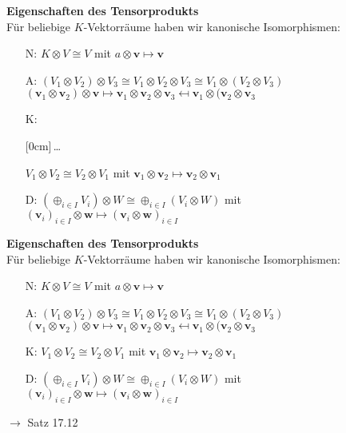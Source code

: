 \documentclass[11pt]{article}
\renewcommand{\cite}[1]{\par\bigskip\hfill{\color{gray}\tiny\(\to\) #1}}
\renewcommand{\vec}[1]{\mathbf{#1}}
\newcommand{\hide}[1]{\parbox{0cm}{\raisebox{-7pt}[0cm]{\dots}}\color{white}#1\color{black}}
\let\olddots\dots
\renewcommand{\dots}{\,\olddots\,}
\newenvironment{field}{}{\newpage}
\newif\ifnote
\newenvironment{note}{\notetrue}{\notefalse}
\begin{document}
\begin{note}
    \begin{field}
        \textbf{Eigenschaften des Tensorprodukts}\\
        Für beliebige $K$-Vektorräume haben wir kanonische Isomorphismen:
        \begin{itemize}
            \item[N:] $K\otimes V \cong V$ mit $a\otimes \vec{v} \mapsto \vec{v}$
            \item[A:] $(V_1\otimes V_2)\otimes V_3 \cong V_1\otimes V_2 \otimes V_3 \cong V_1\otimes (V_2\otimes V_3)$\\
            $(\vec{v}_1\otimes\vec{v}_2)\otimes\vec{v} \mapsto \vec{v}_1\otimes\vec{v}_2\otimes\vec{v}_3 \mapsfrom \vec{v}_1\otimes(\vec{v}_2\otimes\vec{v}_3$
            \item[K:] \hide{$V_1\otimes V_2 \cong V_2\otimes V_1$ mit
            $\vec{v}_1\otimes\vec{v}_2 \mapsto \vec{v}_2\otimes\vec{v}_1$}
            \item[D:] $(\oplus_{i\in I} V_i)\otimes W \cong \oplus_{i\in I}(V_i\otimes W)$ mit \\
            $(\vec{v}_i)_{i\in I}\otimes \vec{w} \mapsto (\vec{v}_i\otimes \vec{w})_{i\in I}$
        \end{itemize}
    \end{field}
    \begin{field}
        \textbf{Eigenschaften des Tensorprodukts}\\
        Für beliebige $K$-Vektorräume haben wir kanonische Isomorphismen:
        \begin{itemize}
            \item[N:] $K\otimes V \cong V$ mit $a\otimes \vec{v} \mapsto \vec{v}$
            \item[A:] $(V_1\otimes V_2)\otimes V_3 \cong V_1\otimes V_2 \otimes V_3 \cong V_1\otimes (V_2\otimes V_3)$\\
            $(\vec{v}_1\otimes\vec{v}_2)\otimes\vec{v} \mapsto \vec{v}_1\otimes\vec{v}_2\otimes\vec{v}_3 \mapsfrom \vec{v}_1\otimes(\vec{v}_2\otimes\vec{v}_3$
            \item[K:] $V_1\otimes V_2 \cong V_2\otimes V_1$ mit
            $\vec{v}_1\otimes\vec{v}_2 \mapsto \vec{v}_2\otimes\vec{v}_1$
            \item[D:] $(\oplus_{i\in I} V_i)\otimes W \cong \oplus_{i\in I}(V_i\otimes W)$ mit \\
            $(\vec{v}_i)_{i\in I}\otimes \vec{w} \mapsto (\vec{v}_i\otimes \vec{w})_{i\in I}$
        \end{itemize}
        \cite{Satz 17.12}
    \end{field}


\end{note}
\end{document}
